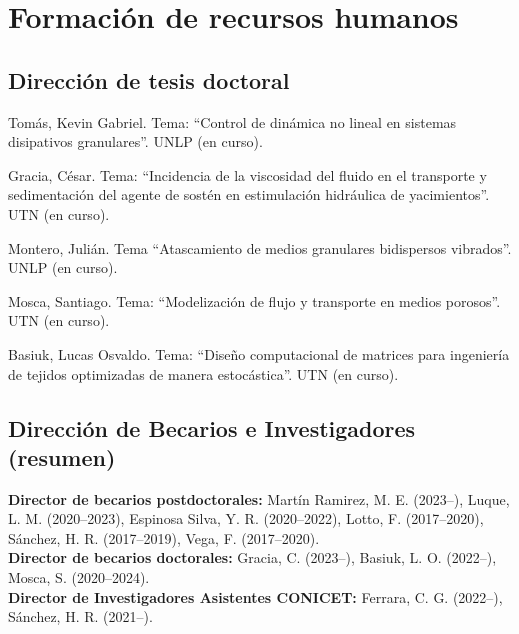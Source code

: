 \section*{Formación de recursos humanos}

\subsection*{Dirección de tesis doctoral}
\begin{timeline}
 Tomás, Kevin Gabriel. Tema: ``Control de dinámica no lineal en sistemas disipativos granulares''. UNLP (en curso).

 Gracia, César. Tema: ``Incidencia de la viscosidad del fluido en el transporte y sedimentación del agente de sostén en estimulación hidráulica de yacimientos''. UTN (en curso).

 Montero, Julián. Tema ``Atascamiento de medios granulares bidispersos vibrados''. UNLP (en curso).

 Mosca, Santiago. Tema: ``Modelización de flujo y transporte en medios porosos''. UTN (en curso).

 Basiuk, Lucas Osvaldo. Tema: ``Diseño computacional de matrices para ingeniería de tejidos optimizadas de manera estocástica''. UTN  (en curso).
\end{timeline}

\subsection*{Dirección de Becarios e Investigadores (resumen)}
\textbf{Director de becarios postdoctorales:} Martín Ramirez, M. E. (2023--), Luque, L. M. (2020--2023), Espinosa Silva, Y. R. (2020--2022), Lotto, F. (2017--2020), Sánchez, H. R. (2017--2019), Vega, F. (2017--2020). \\
\textbf{Director de becarios doctorales:} Gracia, C. (2023--), Basiuk, L. O. (2022--), Mosca, S. (2020--2024).\\
\textbf{Director de Investigadores Asistentes CONICET:} Ferrara, C. G. (2022--), Sánchez, H. R. (2021--).
